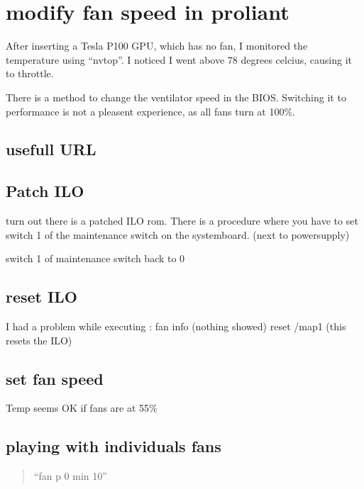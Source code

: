 \documentclass[letterpaper,10pt,english]{sphinxmanual}
\begin{document}
\sphinxstepscope


\chapter{modify fan speed in proliant}
\label{\detokenize{fan:modify-fan-speed-in-proliant}}\label{\detokenize{fan::doc}}
\sphinxAtStartPar
After inserting a Tesla P100 GPU, which has no fan, I monitored the temperature using “nvtop”. I noticed I went above 78 degrees celcius, causing it to throttle.

\sphinxAtStartPar
There is a method to change the ventilator speed in the BIOS. Switching it to performance is not a pleasent experience, as all fans turn at 100\%.


\section{usefull URL}
\label{\detokenize{fan:usefull-url}}
\sphinxAtStartPar
{}

\sphinxAtStartPar
{}


\section{Patch ILO}
\label{\detokenize{fan:patch-ilo}}
\sphinxAtStartPar
turn out there is a patched ILO rom. There is a procedure where you have to set switch 1 of the maintenance switch on the systemboard. (next to powersupply)

\sphinxAtStartPar
switch 1 of maintenance switch back to 0


\section{reset ILO}
\label{\detokenize{fan:reset-ilo}}
\sphinxAtStartPar
I had a problem while executing : fan info (nothing showed)
reset /map1 (this resets the ILO)


\section{set fan speed}
\label{\detokenize{fan:set-fan-speed}}
\sphinxAtStartPar
Temp seems OK if fans are at 55\%


\section{playing with individuals fans}
\label{\detokenize{fan:playing-with-individuals-fans}}\begin{quote}

\sphinxAtStartPar
“fan p 0 min 10”
\end{quote}
\end{document}
